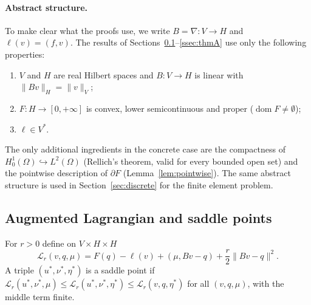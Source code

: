 \documentclass[11pt]{amsart}
\theoremstyle{definition}
\theoremstyle{remark}
\numberwithin{equation}{section}
\newcommand{\Lag}{\mathcal{L}_r}
\newcommand{\norm}[1]{\lVert #1\rVert}
\DeclareMathOperator{\dom}{dom}
\begin{document}
\paragraph{Abstract structure.}
To make clear what the proofs use, we write $B=\nabla\colon V\to H$ and $\ell(v)=(f,v)$. The results of Sections~\ref{ssec:saddle}--\ref{ssec:thmA} use only the following properties:
\begin{enumerate}[label=(A\arabic*),leftmargin=2.8em]
\item\label{A1} $V$ and $H$ are real Hilbert spaces and $B\colon V\to H$ is linear with $\norm{Bv}_H=\norm v_V$;
\item\label{A2} $F\colon H\to[0,+\infty]$ is convex, lower semicontinuous and proper ($\dom F\ne\emptyset$);
\item\label{A3} $\ell\in V^*$.
\end{enumerate}
The only additional ingredients in the concrete case are the compactness of $H^1_0(\Omega)\hookrightarrow L^2(\Omega)$ (Rellich's theorem, valid for every bounded open set) and the pointwise description of $\partial F$ (Lemma~\ref{lem:pointwise}). The same abstract structure is used in Section~\ref{sec:discrete} for the finite element problem.

\subsection{Augmented Lagrangian and saddle points}\label{ssec:saddle}
For $r>0$ define on $V\times H\times H$
\[
\Lag(v,q,\mu)=F(q)-\ell(v)+(\mu,Bv-q)+\frac r2\norm{Bv-q}^2 .
\]
A triple $(u^*,\nu^*,\eta^*)$ is a saddle point if $\Lag(u^*,\nu^*,\mu)\le\Lag(u^*,\nu^*,\eta^*)\le\Lag(v,q,\eta^*)$ for all $(v,q,\mu)$, with the middle term finite.
\end{document}
